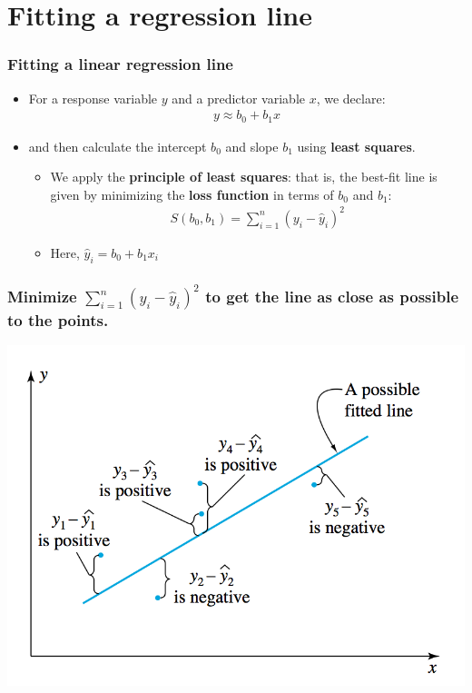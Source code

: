 \documentclass[handout]{beamer}\usepackage{graphicx, color}
\providecommand{\wh}[1]{\widehat{#1}}
\numberwithin{equation}{section}
\begin{document}
\section{Fitting a regression line}

\begin{frame}
\frametitle{Fitting a linear regression line}
\begin{itemize}
\pause \item For a response variable $y$ and a predictor variable $x$, we declare:
\pause \begin{align*}
y \approx b_0 + b_1 x
\end{align*}
\pause \item and then calculate the intercept $b_0$ and slope $b_1$ using {\bf least squares}.
\begin{itemize}
\pause \item We apply the {\bf principle of least squares}: that is, the best-fit line is given by minimizing the {\bf loss function} in terms of $b_0$ and $b_1$:
\pause \begin{align*}
S(b_0, b_1) = \sum_{i = 1}^n (y_i - \wh{y}_i)^2
\end{align*} 
\pause \item Here, $\wh{y}_i  = b_0 + b_1 x_i$
\end{itemize}
\end{itemize}
\end{frame}


\begin{frame}
\frametitle{\small Minimize $\sum_{i = 1}^n (y_i - \wh{y}_i)^2$ to get the line as close as possible to the points.}
 \includegraphics{../../fig/lossfunplot.png}
\end{frame}
\end{document}
